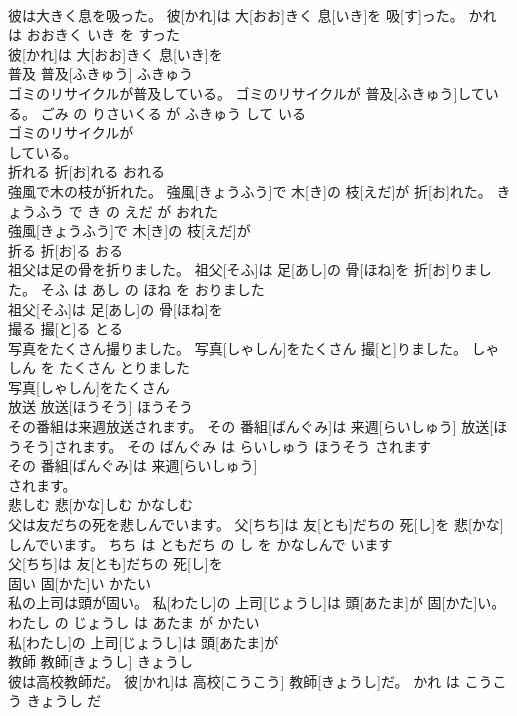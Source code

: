 \documentclass[8pt]{extreport}
\begin{document}
\begin{CJK}{UTF8}{min}
\\	彼は大きく息を吸った。	彼[かれ]は 大[おお]きく 息[いき]を 吸[す]った。	かれ は おおきく いき を すった	
\\	彼[かれ]は 大[おお]きく 息[いき]を
\\	普及	普及[ふきゅう]	ふきゅう	
\\	ゴミのリサイクルが普及している。	ゴミのリサイクルが 普及[ふきゅう]している。	ごみ の りさいくる が ふきゅう して いる	
\\	ゴミのリサイクルが
\\	している。			
\\	折れる	折[お]れる	おれる	
\\	強風で木の枝が折れた。	強風[きょうふう]で 木[き]の 枝[えだ]が 折[お]れた。	きょうふう で き の えだ が おれた	
\\	強風[きょうふう]で 木[き]の 枝[えだ]が
\\	折る	折[お]る	おる	
\\	祖父は足の骨を折りました。	祖父[そふ]は 足[あし]の 骨[ほね]を 折[お]りました。	そふ は あし の ほね を おりました	
\\	祖父[そふ]は 足[あし]の 骨[ほね]を
\\	撮る	撮[と]る	とる	
\\	写真をたくさん撮りました。	写真[しゃしん]をたくさん 撮[と]りました。	しゃしん を たくさん とりました	
\\	写真[しゃしん]をたくさん
\\	放送	放送[ほうそう]	ほうそう	
\\	その番組は来週放送されます。	その 番組[ばんぐみ]は 来週[らいしゅう] 放送[ほうそう]されます。	その ばんぐみ は らいしゅう ほうそう されます	
\\	その 番組[ばんぐみ]は 来週[らいしゅう]
\\	されます。			
\\	悲しむ	悲[かな]しむ	かなしむ	
\\	父は友だちの死を悲しんでいます。	父[ちち]は 友[とも]だちの 死[し]を 悲[かな]しんでいます。	ちち は ともだち の し を かなしんで います	
\\	父[ちち]は 友[とも]だちの 死[し]を
\\	固い	固[かた]い	かたい	
\\	私の上司は頭が固い。	私[わたし]の 上司[じょうし]は 頭[あたま]が 固[かた]い。	わたし の じょうし は あたま が かたい	
\\	私[わたし]の 上司[じょうし]は 頭[あたま]が
\\	教師	教師[きょうし]	きょうし	
\\	彼は高校教師だ。	彼[かれ]は 高校[こうこう] 教師[きょうし]だ。	かれ は こうこう きょうし だ	

\end{CJK}
\end{document}
